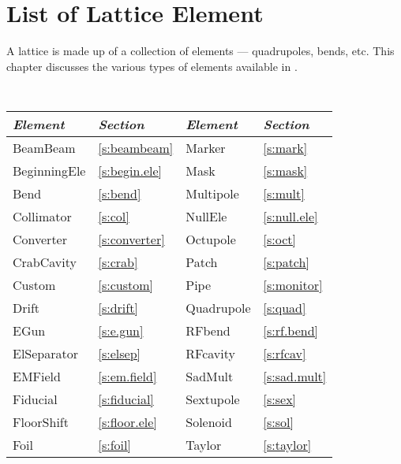 \chapter{List of Lattice Element}
\label{c:element-list}


A lattice is made up of a collection of elements --- quadrupoles,
bends, etc. This chapter discusses the various types of elements
available in \bmadjl.

\begin{table}[htb]
\centering
{\tt
\begin{tabular}{llll} \toprule
  {\it Element}    & {\it Section}         & {\it Element}      & {\it Section}       \\ \midrule
  BeamBeam         & \ref{s:beambeam}      &  Marker            & \ref{s:mark}        \\ 
  BeginningEle     & \ref{s:begin.ele}     &  Mask              & \ref{s:mask}        \\
  Bend             & \ref{s:bend}          &  Multipole         & \ref{s:mult}        \\
  Collimator       & \ref{s:col}           &  NullEle           & \ref{s:null.ele}    \\
  Converter        & \ref{s:converter}     &  Octupole          & \ref{s:oct}         \\
  CrabCavity       & \ref{s:crab}          &  Patch             & \ref{s:patch}       \\
  Custom           & \ref{s:custom}        &  Pipe              & \ref{s:monitor}     \\  
  Drift            & \ref{s:drift}         &  Quadrupole        & \ref{s:quad}        \\
  EGun             & \ref{s:e.gun}         &  RFbend            & \ref{s:rf.bend}     \\
  ElSeparator      & \ref{s:elsep}         &  RFcavity          & \ref{s:rfcav}       \\ 
  EMField          & \ref{s:em.field}      &  SadMult           & \ref{s:sad.mult}    \\
  Fiducial         & \ref{s:fiducial}      &  Sextupole         & \ref{s:sex}         \\
  FloorShift       & \ref{s:floor.ele}     &  Solenoid          & \ref{s:sol}         \\
  Foil             & \ref{s:foil}          &  Taylor            & \ref{s:taylor}      \\

\end{tabular}}
\end{table}
